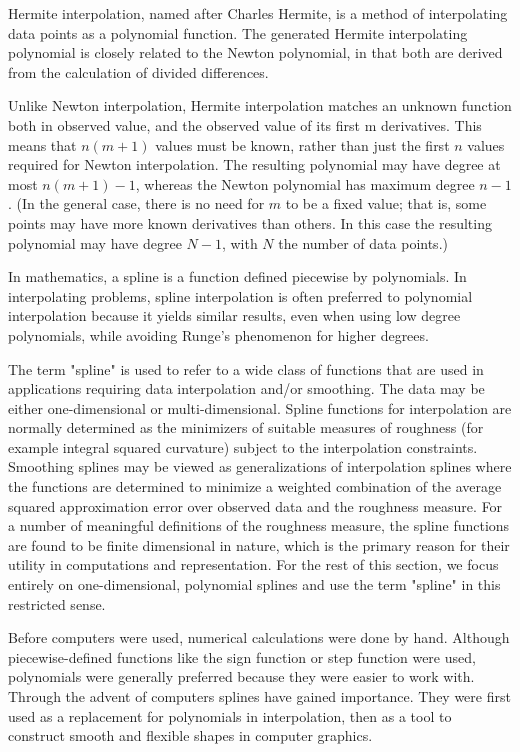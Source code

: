 \documentclass[preprint,12pt]{elsarticle}
\begin{document}
Hermite interpolation, named after Charles Hermite, is a method of interpolating data points as a polynomial function. The generated Hermite interpolating polynomial is closely related to the Newton polynomial, in that both are derived from the calculation of divided differences.

Unlike Newton interpolation, Hermite interpolation matches an unknown function both in observed value, and the observed value of its first m derivatives. This means that $n(m+1)$ values must be known, rather than just the first $n$ values required for Newton interpolation. The resulting polynomial may have degree at most $n(m+1)-1$, whereas the Newton polynomial has maximum degree $n-1$. (In the general case, there is no need for $m$ to be a fixed value; that is, some points may have more known derivatives than others. In this case the resulting polynomial may have degree $N-1$, with $N$ the number of data points.)

In mathematics, a spline is a function defined piecewise by polynomials. In interpolating problems, spline interpolation is often preferred to polynomial interpolation because it yields similar results, even when using low degree polynomials, while avoiding Runge's phenomenon for higher degrees.

The term "spline" is used to refer to a wide class of functions that are used in applications requiring data interpolation and/or smoothing. The data may be either one-dimensional or multi-dimensional. Spline functions for interpolation are normally determined as the minimizers of suitable measures of roughness (for example integral squared curvature) subject to the interpolation constraints. Smoothing splines may be viewed as generalizations of interpolation splines where the functions are determined to minimize a weighted combination of the average squared approximation error over observed data and the roughness measure. For a number of meaningful definitions of the roughness measure, the spline functions are found to be finite dimensional in nature, which is the primary reason for their utility in computations and representation. For the rest of this section, we focus entirely on one-dimensional, polynomial splines and use the term "spline" in this restricted sense.

Before computers were used, numerical calculations were done by hand. Although piecewise-defined functions like the sign function or step function were used, polynomials were generally preferred because they were easier to work with. Through the advent of computers splines have gained importance. They were first used as a replacement for polynomials in interpolation, then as a tool to construct smooth and flexible shapes in computer graphics.
\end{document}
